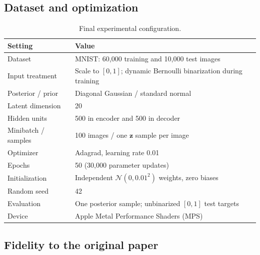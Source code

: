 \documentclass[11pt]{article}
\begin{document}
\subsection{Dataset and optimization}

\begin{table}[H]
\centering
\caption{Final experimental configuration.}
\label{tab:hyperparameters}
\begin{tabularx}{0.84\textwidth}{@{}l X@{}}
\toprule
Setting & Value \\
\midrule
Dataset & MNIST: 60,000 training and 10,000 test images \\
Input treatment & Scale to $[0,1]$; dynamic Bernoulli binarization during training \\
Posterior / prior & Diagonal Gaussian / standard normal \\
Latent dimension & 20 \\
Hidden units & 500 in encoder and 500 in decoder \\
Minibatch / samples & 100 images / one $\bm{z}$ sample per image \\
Optimizer & Adagrad, learning rate 0.01 \\
Epochs & 50 (30,000 parameter updates) \\
Initialization & Independent $\mathcal{N}(0,0.01^2)$ weights, zero biases \\
Random seed & 42 \\
Evaluation & One posterior sample; unbinarized $[0,1]$ test targets \\
Device & Apple Metal Performance Shaders (MPS) \\
\bottomrule
\end{tabularx}
\end{table}

\subsection{Fidelity to the original paper}
\label{sec:fidelity}
\end{document}
